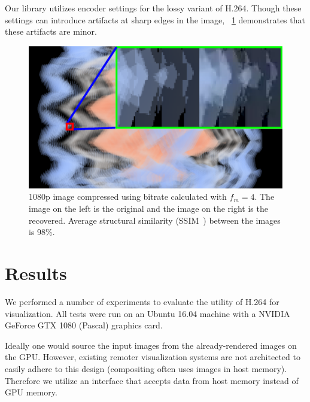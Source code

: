 \documentclass[review]{vgtc}                 %
\begin{document}
Our library utilizes encoder settings for the lossy variant of H.264. Though
these settings can introduce artifacts at sharp edges in the image,
~\cref{fig:quality} demonstrates that these artifacts are minor.

\begin{figure}[h]
  \centering
  \includegraphics[width=\columnwidth]{quality.eps}
  \caption{1080p image compressed using bitrate calculated with
  \(f_m=4\). The image on the left is the original and the image on the right
  is the recovered. Average structural similarity (SSIM~\cite{wang2004image})
  between the images is 98\%.}
  \label{fig:quality}
\end{figure}

\section{Results}


We performed a number of experiments to evaluate the utility of H.264
for visualization. All tests were run on an Ubuntu 16.04 machine with a
NVIDIA GeForce GTX 1080 (Pascal) graphics card.


Ideally one would source the input images from the already-rendered
images on the GPU. However, existing remoter visualization systems are
not architected to easily adhere to this design (compositing often uses
images in host memory). Therefore we utilize an interface that accepts
data from host memory instead of GPU memory.
\end{document}
